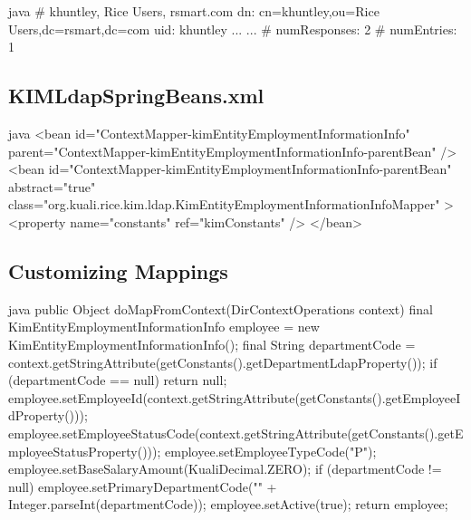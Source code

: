 \documentclass[12pt,notitlepage]{article}
\begin{document}
\begin{s5presentation}
\begin{s5slide}
\begin{code}{java}
# khuntley, Rice Users, rsmart.com
dn: cn=khuntley,ou=Rice Users,dc=rsmart,dc=com
uid: khuntley
...
...
# numResponses: 2
# numEntries: 1
\end{code}

    \W \end{s5slide}


%
%
  \W \begin{s5slide}
    \section{KIMLdapSpringBeans.xml}
    \begin{code}{java}
<bean id="ContextMapper-kimEntityEmploymentInformationInfo" 
      parent="ContextMapper-kimEntityEmploymentInformationInfo-parentBean" />
<bean id="ContextMapper-kimEntityEmploymentInformationInfo-parentBean" 
      abstract="true" 
      class="org.kuali.rice.kim.ldap.KimEntityEmploymentInformationInfoMapper" >
  <property name="constants" ref="kimConstants" />
</bean>

      \end{code}
    \W \end{s5slide}

%
%
  \W \begin{s5slide}
    \section{Customizing Mappings}
    \begin{code}{java}
public Object doMapFromContext(DirContextOperations context) {
    final KimEntityEmploymentInformationInfo employee = new KimEntityEmploymentInformationInfo();
    final String departmentCode = context.getStringAttribute(getConstants().getDepartmentLdapProperty());        
    if (departmentCode == null) {
            return null;
    }        
    employee.setEmployeeId(context.getStringAttribute(getConstants().getEmployeeIdProperty()));
    employee.setEmployeeStatusCode(context.getStringAttribute(getConstants().getEmployeeStatusProperty()));
    employee.setEmployeeTypeCode("P");
    employee.setBaseSalaryAmount(KualiDecimal.ZERO);        
    if (departmentCode != null) {
        employee.setPrimaryDepartmentCode("" + Integer.parseInt(departmentCode));
    }
    employee.setActive(true);
    return employee;
}
\end{code}
\W \end{s5slide}


\end{s5presentation}
\end{document}
